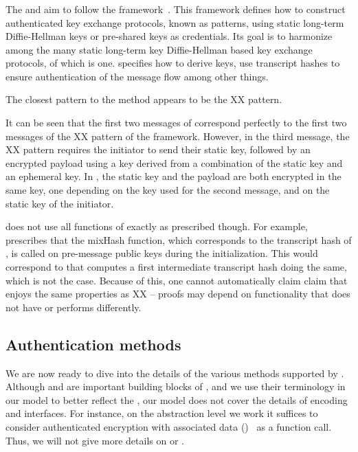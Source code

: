 \subsubsection{\mNoise{}}
The \mStatStat{} and \mPskPsk{} aim to follow the \mNoise{}
framework~\cite{perrin2016noise}.
%
This framework defines how to construct authenticated key exchange protocols,
known as patterns, using static long-term Diffie-Hellman keys or pre-shared
keys as
credentials.
%
Its goal is to harmonize among the many static long-term key Diffie-Hellman 
based key
exchange protocols, of which \mOptls{} is one.
%
\mNoise{} specifies how to derive keys, use transcript hashes to ensure
authentication of the message flow among other things.
%

The closest \mNoise{} pattern to the \mStatStat{} method appears to be the
XX pattern.
%

{\color{blue}
It can be seen that the first two messages of \mStatStat{}
correspond perfectly to the first two messages of the XX pattern of
the \mNoise{} framework.
%
However, in the third message, the XX pattern requires
the initiator to send their static key, followed by an encrypted payload using a
key derived from a combination of the static key and an ephemeral key.
%
In \mEdhoc{}, the static key and the payload are both encrypted in the same key, one depending on the key used for the second message, and on the static key of the initiator.
}

\mEdhoc{} does not use all functions of \mNoise{} exactly as prescribed though.
%
For example, \mNoise{} prescribes that the mixHash function, which corresponds
to the transcript hash of \mEdhoc{}, is called on pre-message public keys
during the initialization.
%
This would correspond to that \mEdhoc{} computes a first intermediate transcript
hash doing the same, which is not the case.
%
Because of this, one cannot automatically claim claim that \mEdhoc{} enjoys
the same properties as XX -- proofs may depend on functionality that \mEdhoc{}
does not have or performs differently.
%

\subsection{Authentication methods}
\label{sec:methods}
We are now ready to dive into the details of the various methods supported by
\mEdhoc.
%
Although \mCose{} and \mCbor{} are important building blocks of \mEdhoc{}, and
we use their terminology in our \mTamarin{} model to better reflect the
\mSpec{}, our model does not cover
the details of encoding and \mCose{} interfaces.
%
For instance, on the abstraction level we work it suffices to consider
authenticated encryption with associated data (\mAead{})~\cite{aead} as a
function call.
%
Thus, we will not give more details on \mCose{} or \mCbor{}.
%

